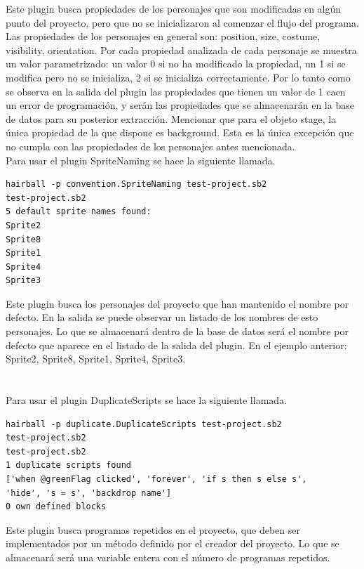 \documentclass[a4paper, 12pt]{book}
\begin{document}
Este plugin busca propiedades de los personajes que son modificadas en algún punto del 
proyecto, pero que no se inicializaron al comenzar el flujo del programa. Las propiedades 
de los personajes en general son: position, size, costume, visibility, orientation. 
Por cada propiedad analizada de cada personaje se muestra un valor parametrizado: un valor 
0 si no ha modificado la propiedad, un 1 si se modifica pero no se inicializa, 2 si se inicializa
correctamente. Por lo tanto como se observa en la salida del plugin las propiedades que tienen
 un valor de 1 caen un error de programación, y serán las propiedades que se almacenarán en la
base de datos para su posterior extracción. Mencionar que para el objeto stage, la única 
propiedad de la que dispone es background. Esta es la única excepción que no cumpla con 
las propiedades de los personajes antes mencionada. \\


Para usar el plugin SpriteNaming se hace la siguiente llamada.
\begingroup
\fontsize{8pt}{9pt}\selectfont
\begin{verbatim}
hairball -p convention.SpriteNaming test-project.sb2 
test-project.sb2
5 default sprite names found:
Sprite2
Sprite8
Sprite1
Sprite4
Sprite3
\end{verbatim}
\endgroup

Este plugin busca los personajes del proyecto que han mantenido el nombre por defecto. En
la salida se puede observar un listado de los nombres de esto personajes. Lo que se 
almacenará dentro de la base de datos será el nombre por defecto que aparece en el listado
de la salida del plugin. En el ejemplo anterior: Sprite2, Sprite8, Sprite1, Sprite4, Sprite3. \\ \\ \\

Para usar el plugin DuplicateScripts se hace la siguiente llamada.
\begingroup
\fontsize{8pt}{9pt}\selectfont
\begin{verbatim}
hairball -p duplicate.DuplicateScripts test-project.sb2 
test-project.sb2
test-project.sb2
1 duplicate scripts found
['when @greenFlag clicked', 'forever', 'if s then s else s',
'hide', 's = s', 'backdrop name']
0 own defined blocks
\end{verbatim}
\endgroup

Este plugin busca programas repetidos en el proyecto, que deben ser implementados por un
método definido por el creador del proyecto. Lo que se almacenará será una variable entera
con el número de programas repetidos. \\
\end{document}
